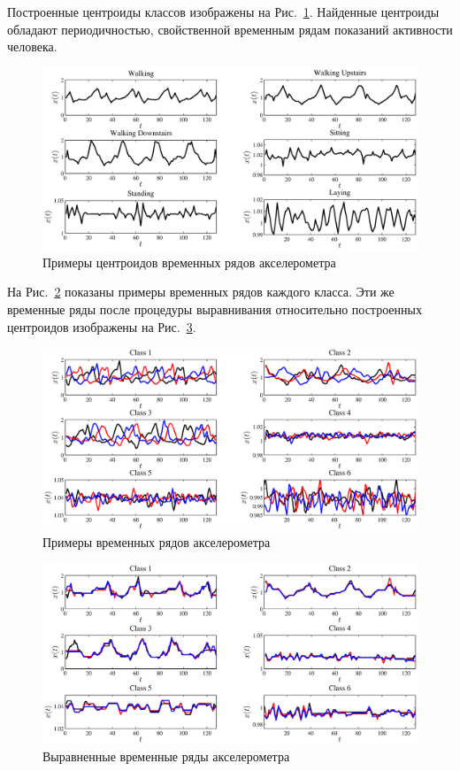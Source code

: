 	Построенные центроиды классов изображены на Рис.~\ref{ch5:fig:centroids_real}.
	Найденные центроиды обладают периодичностью, свойственной временным рядам показаний активности человека.
	\begin{figure}[ht]
		\centering
		\includegraphics[width=1\linewidth]{figs/ch5/centroids_200_2}
		\caption{Примеры центроидов временных рядов акселерометра}
		\label{ch5:fig:centroids_real}
	\end{figure}
	На Рис.~\ref{ch5:fig:raw_ts} показаны примеры временных рядов каждого класса. Эти же временные ряды после процедуры выравнивания относительно построенных центроидов изображены на Рис.~\ref{ch5:fig:aligned_ts}.
	\begin{figure}[!ht]
		\centering
		\includegraphics[width=1\linewidth]{figs/ch5/raw_ts}
		\caption{Примеры временных рядов акселерометра}
		\label{ch5:fig:raw_ts}
	\end{figure}
	\begin{figure}[!ht]
		\centering
		\includegraphics[width=1\linewidth]{figs/ch5/aligned_ts}
		\caption{Выравненные временные ряды акселерометра}
		\label{ch5:fig:aligned_ts}
	\end{figure}
	
